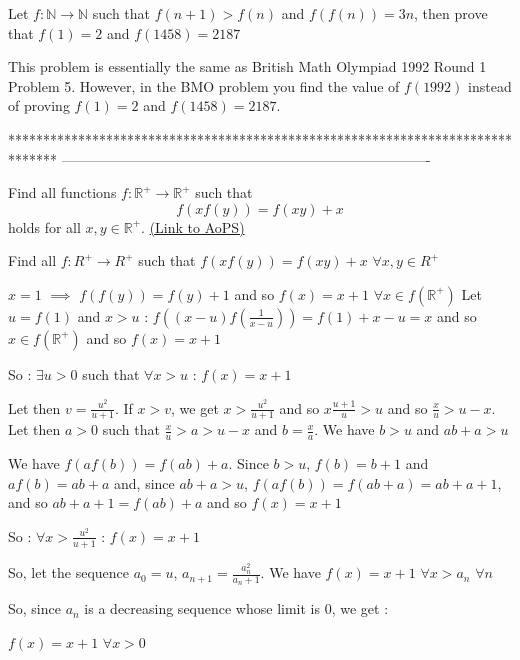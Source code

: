 \begin{solution}
	\begin{tcolorbox}Let $ f : \mathbb{N}\rightarrow \mathbb{N}$ such that $ f(n + 1) > f(n)$ and $ f(f(n)) = 3n$, then prove that $ f(1) = 2$ and $ f(1458) = 2187$\end{tcolorbox}
This problem is essentially the same as British Math Olympiad 1992 Round 1 Problem 5. However, in the BMO problem you find the value of $ f(1992)$ instead of proving $ f(1) = 2$ and $ f(1458) = 2187$.
\end{solution}
*******************************************************************************
-------------------------------------------------------------------------------

\begin{problem}
	Find all functions $ f: \mathbb R^+ \rightarrow \mathbb R^+$ such that
\[f(xf(y))=f(xy)+x\]
holds for all $x,y\in \mathbb R^+$.
	\flushright \href{https://artofproblemsolving.com/community/c6h276360}{(Link to AoPS)}
\end{problem}



\begin{solution}
	\begin{tcolorbox}Find all $ f: R^ + \rightarrow R^ +$ such that
$ f(xf(y)) = f(xy) + x$ $ \forall x,y\in R^ +$\end{tcolorbox}

$ x=1$ $ \implies$ $ f(f(y))=f(y)+1$ and so $ f(x)=x+1$ $ \forall x\in f(\mathbb R^+)$
Let $ u=f(1)$ and $ x>u$ : $ f((x-u)f(\frac{1}{x-u}))=f(1)+x-u=x$ and so $ x\in f(\mathbb R^+)$ and so  $ f(x)=x+1$

So : $ \exists u>0$ such that $ \forall x>u$ : $ f(x)=x+1$

Let then $ v=\frac{u^2}{u+1}$. If $ x>v$, we get $ x>\frac{u^2}{u+1}$ and so $ x\frac{u+1}{u}>u$ and so $ \frac{x}{u}>u-x$.
Let then $ a>0$ such that $ \frac{x}{u}>a>u-x$ and $ b=\frac{x}{a}$. We have $ b>u$ and $ ab+a>u$

We have $ f(af(b))=f(ab)+a$. Since $ b>u$, $ f(b)=b+1$ and $ af(b)=ab+a$ and, since $ ab+a>u$, $ f(af(b))=f(ab+a)=ab+a+1$, and so $ ab+a+1=f(ab)+a$ and so $ f(x)=x+1$

So : $ \forall x>\frac{u^2}{u+1}$ : $ f(x)=x+1$

So, let the sequence $ a_0=u$, $ a_{n+1}=\frac{a_n^2}{a_n+1}$. We have $ f(x)=x+1$ $ \forall x>a_n$ $ \forall n$

So, since $ a_n$ is a decreasing sequence whose limit is 0, we get :

$ f(x)=x+1$ $ \forall x>0$
\end{solution}



